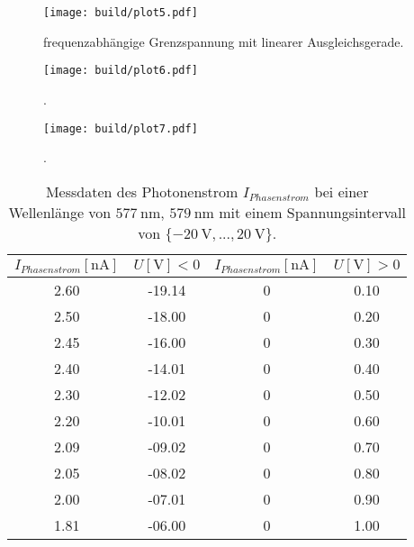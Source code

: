 \begin{figure}
    \centering
    \texttt{[image: build/plot5.pdf]}
    \caption{frequenzabhängige Grenzspannung mit linearer Ausgleichsgerade.} 
    \label{fig:frequenzstuff}
\end{figure}

\begin{figure}
    \centering
    \texttt{[image: build/plot6.pdf]}
    \caption{.} 
    \label{fig:1}
\end{figure}


\begin{figure}
    \centering
    \texttt{[image: build/plot7.pdf]}
    \caption{.} 
    \label{fig:2}
\end{figure}

\begin{table}
    \centering
    \caption{Messdaten des Photonenstrom $I_{Phasenstrom}$ bei einer Wellenlänge von $\SI{577}{\nano\meter}$, $\SI{579}{\nano\meter}$ mit einem Spannungsintervall von $\{\SI{-20}{\volt},... ,\SI{20}{\volt}\}$.}
    \label{tab:tab1}
    \begin{tabular}{c c || c c}
        \toprule
        $I_{Phasenstrom}[\si{\nano\ampere}]$ & $U [\si{\volt}] < 0$ & $I_{Phasenstrom}[\si{\nano\ampere}]$ & $U [\si{\volt}] > 0$ \\
        \midrule
        2.60         &         -19.14  &  0            &           0.10    \\    
        2.50         &         -18.00  &  0            &           0.20    \\    
        2.45         &         -16.00  &  0            &           0.30    \\    
        2.40         &         -14.01  &  0            &           0.40    \\    
        2.30         &         -12.02  &  0            &           0.50    \\    
        2.20         &         -10.01  &  0            &           0.60    \\    
        2.09         &         -09.02  &  0            &           0.70    \\    
        2.05         &         -08.02  &  0            &           0.80    \\    
        2.00         &         -07.01  &  0            &           0.90    \\    
        1.81         &         -06.00  &  0            &           1.00    \\    

\end{tabular}
\end{table}
